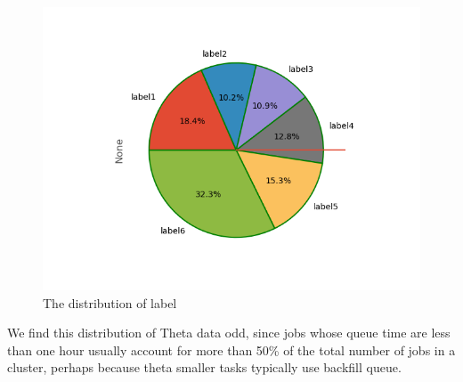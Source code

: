 \documentclass[conference,compsoc]{IEEEtran}
\begin{document}
\begin{figure}[htbp]   %
	
	\centering
	
	\includegraphics[width=\linewidth,scale=1.00]{myplot.png}
	
	
	\caption{The distribution of label}
	
	\label{Fig:1}
	
\end{figure}
We find this distribution of Theta data odd, since jobs whose queue time are less than one hour usually account for more than 50\% of the total number of jobs in a cluster\cite{kumar2012identifying}, perhaps because theta smaller tasks typically use backfill queue.
\end{document}
